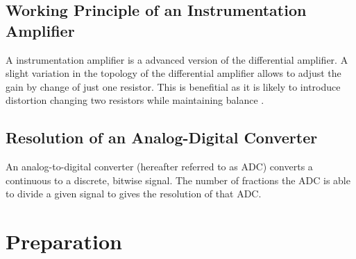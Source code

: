         \subsection*{Working Principle of an Instrumentation Amplifier}
            A instrumentation amplifier is a advanced version of the differential amplifier. A slight variation in the topology
            of the differential amplifier allows to adjust the gain by change of just one resistor. This is benefitial as
            it is likely to introduce distortion changing two resistors while maintaining balance \cite{instrumentation.amp.lessons.electric.circuits.20200216,instrumentation.amp.Kuphaldt.20150217}.
        \subsection*{Resolution of an Analog-Digital Converter}
            An analog-to-digital converter (hereafter referred to as ADC) converts a continuous to a discrete, bitwise signal.
            The number of fractions the ADC is able to divide a given signal to gives the resolution of that ADC.
    \section{Preparation}
